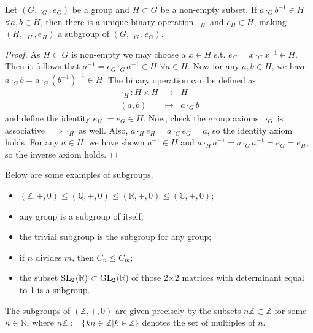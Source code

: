 \documentclass[a4paper]{article}
\begin{document}
\begin{prop}
Let $(G,\cdot_G,e_G)$ be a group and $H\subset G$ be a non-empty subset. If $a\cdot_G b^{-1}\in H$ $\forall a,b\in H$, then there is a unique binary operation $\cdot_H$ and $e_H\in H$, making $(H,\cdot_H,e_H)$ a subgroup of $(G,\cdot_G,e_G)$.
\end{prop}
\begin{proof}
As $H\subset G$ is non-empty we may choose a $x\in H$ s.t. $e_G=x\cdot_Gx^{-1}\in H$. Then it follows that $a^{-1}=e_G\cdot_Ga^{-1}\in H$ $\forall a\in H$. Now for any $a,b\in H$, we have $a\cdot_Gb=a\cdot_G(b^{-1})^{-1}\in H$. The binary operation can be defined as
\begin{eqnarray}
\cdot_H:H\times H&\rightarrow&H\nonumber\\(a,b)&\mapsto& a\cdot_Gb\nonumber
\end{eqnarray}
and define the identity $e_H:=e_G\in H$. Now, check the group axioms. $\cdot_G$ is associative $\implies\cdot_H$ as well. Also, $a\cdot_He_H=a\cdot_Ge_G=a$, so the identity axiom holds. For any $a\in H$, we have shown $a^{-1}\in H$ and $a\cdot_Ha^{-1}=a\cdot_Ga^{-1}=e_G=e_H$, so the inverse axiom holds.
\end{proof}
\begin{eg}
Below are some examples of subgroups.
\begin{itemize}
    \item $(\mathbb{Z},+,0)\leq(\mathbb{Q},+,0)\leq(\mathbb{R},+,0)\leq(\mathbb{C},+,0)$;
    \item any group is a subgroup of itself;
    \item the trivial subgroup is the subgroup for any group;
    \item if $n$ divides $m$, then $C_n\leq C_m$;
    \item the subset $\operatorname{SL}_2$($\mathbb{R}$) $\subset\operatorname{GL}_2$($\mathbb{R}$) of those 2$\times2$ matrices with determinant equal to 1 is a subgroup.
\end{itemize}
\end{eg}
\begin{prop}
The subgroups of $(\mathbb{Z},+,0)$ are given precisely by the subsets $n\mathbb{Z}\subset\mathbb{Z}$ for some $n\in\mathbb{N}$, where $n\mathbb{Z}:=\{kn\in\mathbb{Z}|k\in\mathbb{Z}\}$ denotes the set of multiples of $n$.
\end{prop}
\end{document}
